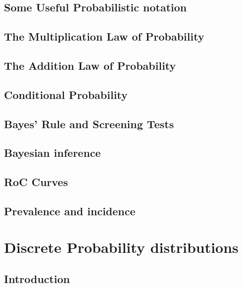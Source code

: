 \documentclass[12pt,]{article}
\theoremstyle{definition}
\theoremstyle{definition}
\theoremstyle{definition}
\theoremstyle{remark}
\begin{document}
\subsection{Some Useful Probabilistic
notation}\label{some-useful-probabilistic-notation}

\subsection{The Multiplication Law of
Probability}\label{the-multiplication-law-of-probability}

\subsection{The Addition Law of
Probability}\label{the-addition-law-of-probability}

\subsection{Conditional Probability}\label{conditional-probability}

\subsection{Bayes' Rule and Screening
Tests}\label{bayes-rule-and-screening-tests}

\subsection{Bayesian inference}\label{bayesian-inference}

\subsection{RoC Curves}\label{roc-curves}

\subsection{Prevalence and incidence}\label{prevalence-and-incidence}

\section{Discrete Probability
distributions}\label{discrete-probability-distributions}

\subsection{Introduction}\label{introduction-1}
\end{document}
